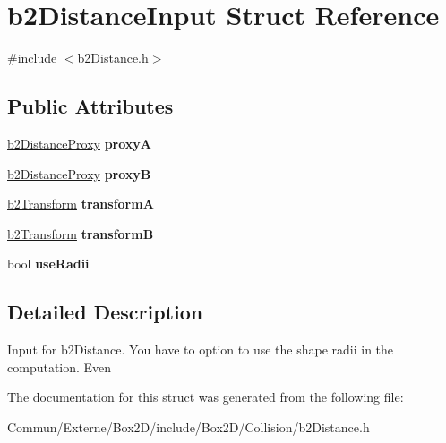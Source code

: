 \hypertarget{structb2_distance_input}{}\section{b2\+Distance\+Input Struct Reference}
\label{structb2_distance_input}


{\ttfamily \#include $<$b2\+Distance.\+h$>$}

\subsection*{Public Attributes}
\begin{DoxyCompactItemize}
\item 
\hyperlink{structb2_distance_proxy}{b2\+Distance\+Proxy} {\bfseries proxyA}\hypertarget{structb2_distance_input_a84d378f4f0e2f06fbe03d413e9dfbbd9}{}\label{structb2_distance_input_a84d378f4f0e2f06fbe03d413e9dfbbd9}

\item 
\hyperlink{structb2_distance_proxy}{b2\+Distance\+Proxy} {\bfseries proxyB}\hypertarget{structb2_distance_input_ad08521a9cdf9d418ececfd44de83a5d3}{}\label{structb2_distance_input_ad08521a9cdf9d418ececfd44de83a5d3}

\item 
\hyperlink{structb2_transform}{b2\+Transform} {\bfseries transformA}\hypertarget{structb2_distance_input_a0889c2f7120ba521d6e40e2a22834ddb}{}\label{structb2_distance_input_a0889c2f7120ba521d6e40e2a22834ddb}

\item 
\hyperlink{structb2_transform}{b2\+Transform} {\bfseries transformB}\hypertarget{structb2_distance_input_a47352d7c5b3db80b2fb8cf338f1c1895}{}\label{structb2_distance_input_a47352d7c5b3db80b2fb8cf338f1c1895}

\item 
bool {\bfseries use\+Radii}\hypertarget{structb2_distance_input_ab72a770be4a91997d00112409de5fea7}{}\label{structb2_distance_input_ab72a770be4a91997d00112409de5fea7}

\end{DoxyCompactItemize}


\subsection{Detailed Description}
Input for b2\+Distance. You have to option to use the shape radii in the computation. Even 

The documentation for this struct was generated from the following file\+:\begin{DoxyCompactItemize}
\item 
Commun/\+Externe/\+Box2\+D/include/\+Box2\+D/\+Collision/b2\+Distance.\+h\end{DoxyCompactItemize}
